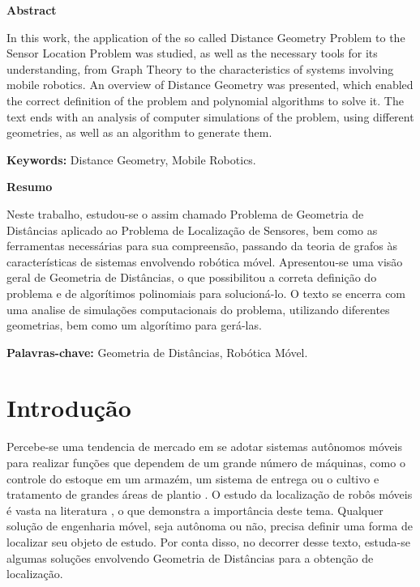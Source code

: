 \documentclass[a4paper,12pt]{report}
\begin{document}
	\begin{center}
		\large
		\textbf{Abstract}
	\end{center}
	
	
	In this work, the application of the so called Distance Geometry Problem to the Sensor Location Problem was studied, as well as the necessary tools for its understanding, from Graph Theory to the characteristics of systems involving mobile robotics. An overview of Distance Geometry was presented, which enabled the correct definition of the problem and polynomial algorithms to solve it. The text ends with an analysis of computer simulations of the problem, using different geometries, as well as an algorithm to generate them.
	
	\textbf{Keywords:} Distance Geometry, Mobile Robotics.
	
	
	\vspace{2cm}	
	\begin{center}
		\large
		\textbf{Resumo}
	\end{center}
	
	Neste trabalho, estudou-se o assim chamado Problema de Geometria de Distâncias aplicado ao Problema de Localização de Sensores, bem como as ferramentas necessárias para sua compreensão, passando da teoria de grafos às características de sistemas envolvendo robótica móvel. Apresentou-se uma visão geral de Geometria de Distâncias, o que possibilitou a correta definição do problema e de algorítimos polinomiais para solucioná-lo. O texto se encerra com uma analise de simulações computacionais do problema, utilizando diferentes geometrias, bem como um algorítimo para gerá-las. 
	
	\textbf{Palavras-chave:} Geometria de Distâncias, Robótica Móvel.
	
	
	\newpage
	\chapter{Introdução}
	
	Percebe-se uma tendencia de mercado em se adotar sistemas autônomos móveis para realizar funções que dependem de um grande número de máquinas, como o controle do estoque em um armazém, um sistema de entrega ou o cultivo e tratamento de grandes áreas de plantio \cite{mobileRobotsCook}. O estudo da localização de robôs móveis é vasta na literatura \cite{eren2004rigidity, mobileRobotsTzafestas}, o que demonstra a importância deste tema. Qualquer solução de engenharia móvel, seja autônoma ou não, precisa definir uma forma de localizar seu objeto de estudo. Por conta disso, no decorrer desse texto, estuda-se algumas soluções envolvendo Geometria de Distâncias para a obtenção de localização.
	\\
	
\end{document}
